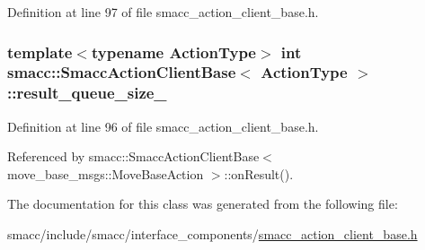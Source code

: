 Definition at line 97 of file smacc\+\_\+action\+\_\+client\+\_\+base.\+h.

\subsubsection[{\texorpdfstring{result\+\_\+queue\+\_\+size\+\_\+}{result_queue_size_}}]{\setlength{\rightskip}{0pt plus 5cm}template$<$typename Action\+Type$>$ {\bf int} {\bf smacc\+::\+Smacc\+Action\+Client\+Base}$<$ Action\+Type $>$\+::result\+\_\+queue\+\_\+size\+\_\+\hspace{0.3cm}{\ttfamily [protected]}}\hypertarget{classsmacc_1_1SmaccActionClientBase_af3a3ef9ababeaf43ed283234657c936a}{}\label{classsmacc_1_1SmaccActionClientBase_af3a3ef9ababeaf43ed283234657c936a}


Definition at line 96 of file smacc\+\_\+action\+\_\+client\+\_\+base.\+h.



Referenced by smacc\+::\+Smacc\+Action\+Client\+Base$<$ move\+\_\+base\+\_\+msgs\+::\+Move\+Base\+Action $>$\+::on\+Result().



The documentation for this class was generated from the following file\+:\begin{DoxyCompactItemize}
\item 
smacc/include/smacc/interface\+\_\+components/\hyperlink{smacc__action__client__base_8h}{smacc\+\_\+action\+\_\+client\+\_\+base.\+h}\end{DoxyCompactItemize}
